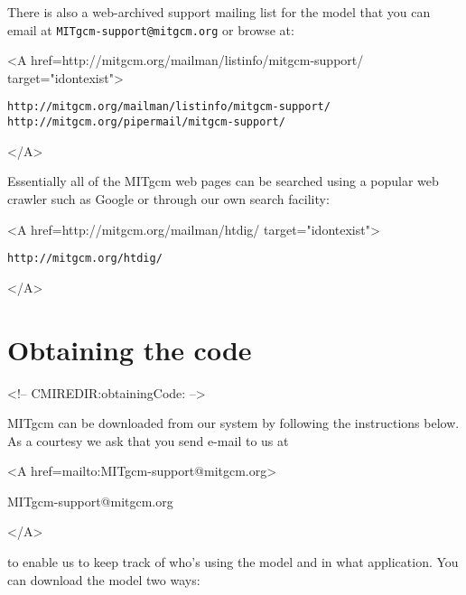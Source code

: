 There is also a web-archived support mailing list for the model that
you can email at \texttt{MITgcm-support@mitgcm.org} or browse at:
\begin{rawhtml} <A href=http://mitgcm.org/mailman/listinfo/mitgcm-support/ target="idontexist"> \end{rawhtml}
\begin{verbatim}
http://mitgcm.org/mailman/listinfo/mitgcm-support/
http://mitgcm.org/pipermail/mitgcm-support/
\end{verbatim}
\begin{rawhtml} </A> \end{rawhtml}
Essentially all of the MITgcm web pages can be searched using a
popular web crawler such as Google or through our own search facility:
\begin{rawhtml} <A href=http://mitgcm.org/mailman/htdig/ target="idontexist"> \end{rawhtml}
\begin{verbatim}
http://mitgcm.org/htdig/
\end{verbatim}
\begin{rawhtml} </A> \end{rawhtml}



\section{Obtaining the code}
\label{sect:obtainingCode}
\begin{rawhtml}
<!-- CMIREDIR:obtainingCode: -->
\end{rawhtml}

MITgcm can be downloaded from our system by following
the instructions below. As a courtesy we ask that you send e-mail to us at
\begin{rawhtml} <A href=mailto:MITgcm-support@mitgcm.org> \end{rawhtml}
MITgcm-support@mitgcm.org
\begin{rawhtml} </A> \end{rawhtml}
to enable us to keep track of who's using the model and in what application.
You can download the model two ways:

